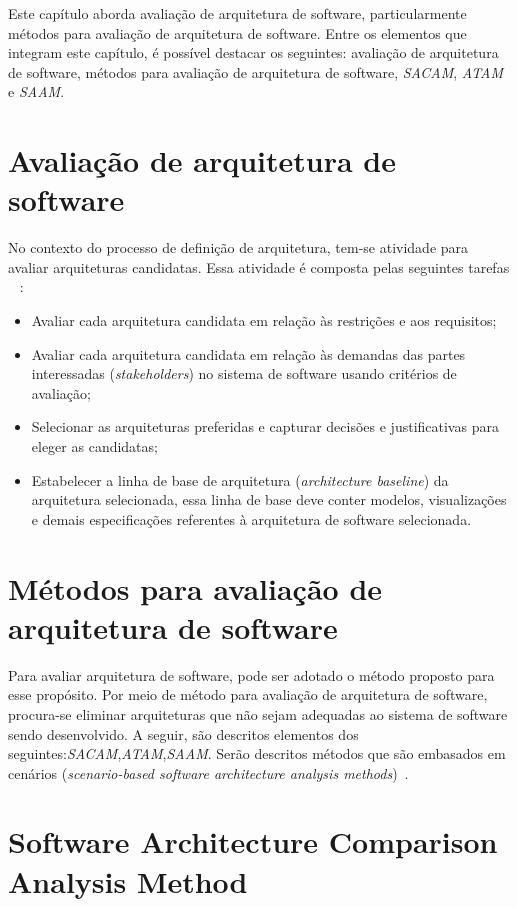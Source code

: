 Este capítulo aborda avaliação de arquitetura de software, particularmente métodos para avaliação de arquitetura de software. Entre os elementos que integram este capítulo, é possível destacar os seguintes: avaliação de arquitetura de software, métodos para avaliação de arquitetura de software, \emph{\acrfull{SACAM}}, \emph{\acrfull{ATAM}} e \emph{\acrfull{SAAM}}.

\section{Avaliação de arquitetura de software}

No contexto do processo de definição de arquitetura, tem-se atividade para avaliar arquiteturas candidatas. Essa atividade é composta pelas seguintes tarefas ~\cite{ISO_12207} :
\begin{itemize}
    \item Avaliar cada arquitetura candidata em relação às restrições e aos requisitos;
    \item Avaliar cada arquitetura candidata em relação às demandas das partes interessadas (\emph{stakeholders}) no sistema de software usando critérios de avaliação;
    \item Selecionar as arquiteturas preferidas e capturar decisões e justificativas para eleger as candidatas;
    \item Estabelecer a linha de base de arquitetura (\emph{architecture baseline}) da arquitetura selecionada, essa linha de base deve conter modelos, visualizações e demais especificações referentes à arquitetura de software selecionada.
\end{itemize}

\section{Métodos para avaliação de arquitetura de software}

Para avaliar arquitetura de software, pode ser adotado o método proposto para esse propósito. Por meio de método para avaliação de arquitetura de software, procura-se eliminar arquiteturas que não sejam adequadas ao sistema de software sendo desenvolvido. A seguir, são descritos elementos dos seguintes:\emph{\acrfull{SACAM}},\emph{\acrfull{ATAM}},\emph{\acrfull{SAAM}}. 
Serão descritos métodos que são embasados em cenários (\emph{scenario-based software architecture analysis methods})~\cite{survey_methods}. 
  
\section{Software Architecture Comparison Analysis Method}

